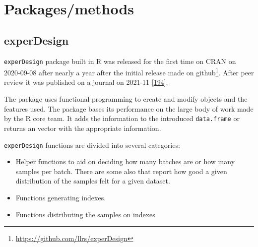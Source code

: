 \documentclass[
  12pt,
  a4paper,
  twoside,
  openright]{book}
\DeclareRobustCommand{\href}[2]{#2\footnote{\url{#1}}}
\begin{document}
\hypertarget{packagesmethods}{%
\section{Packages/methods}\label{packagesmethods}}

\hypertarget{experdesign-1}{%
\subsection{experDesign}\label{experdesign-1}}

\texttt{experDesign} package built in R was released for the first time on CRAN on 2020-09-08 after nearly a year after the initial release made on \href{https://github.com/llrs/experDesign}{github}.
After peer review it was published on a journal on 2021-11 {[}\protect\hyperlink{ref-revillasancho2021}{194}{]}.

The package uses functional programming to create and modify objects and the features used.
The package bases its performance on the large body of work made by the R core team.
It adds the information to the introduced \texttt{data.frame} or returns an vector with the appropriate information.

\texttt{experDesign} functions are divided into several categories:

\begin{itemize}
\item
  Helper functions to aid on deciding how many batches are or how many samples per batch.
  There are some also that report how good a given distribution of the samples felt for a given dataset.
\item
  Functions generating indexes.
\item
  Functions distributing the samples on indexes
\end{itemize}
\end{document}
